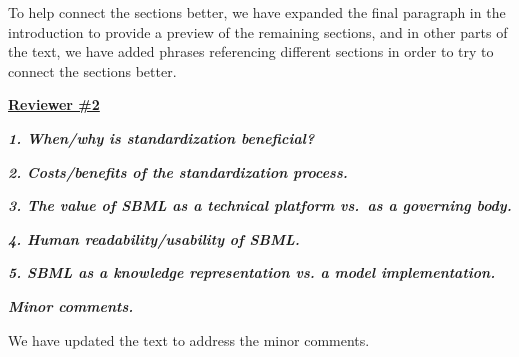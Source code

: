\documentclass[11pt]{mhletter}
\begin{document}
To help connect the sections better, we have expanded the final paragraph in the introduction to provide a preview of the remaining sections, and in other parts of the text, we have added phrases referencing different sections in order to try to connect the sections better.


\clearpage
\textbf{\underline{Reviewer \#2}}

\textbf{\textit{1. When/why is standardization beneficial?}}


\textbf{\textit{2. Costs/benefits of the standardization process.}}


\textbf{\textit{3. The value of SBML as a technical platform vs.\ as a governing body.}}


\textbf{\textit{4. Human readability/usability of SBML.}}


\textbf{\textit{5. SBML as a knowledge representation vs. a model implementation.}}


\textbf{\textit{Minor comments.}}

We have updated the text to address the minor comments.
\end{document}
